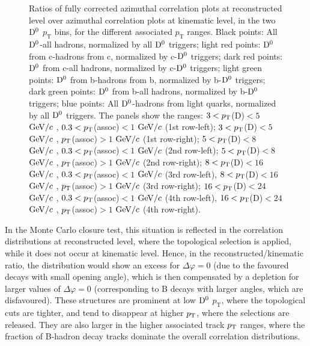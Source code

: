 \begin{figure}
\centering
\caption{Ratios of fully corrected azimuthal correlation plots at reconstructed level over azimuthal correlation plots at kinematic level, in the two ${\rm D^0}$ $p_\text{T}$ bins, for the different associated $p_\text{T}$ ranges. Black points: All ${\rm D^0}$-all hadrons, normalized by all ${\rm D^0}$ triggers; light red points: ${\rm D^0}$ from c-hadrons from c, normalized by c-${\rm D^0}$ triggers; dark red points: ${\rm D^0}$ from c-all hadrons, normalized by c-${\rm D^0}$ triggers; light green points: ${\rm D^0}$ from b-hadrons from b, normalized by b-${\rm D^0}$ triggers; dark green points: ${\rm D^0}$ from b-all hadrons, normalized by b-${\rm D^0}$ triggers; blue points: All ${\rm D^0}$-hadrons from light quarks, normalized by all ${\rm D^0}$ triggers.
The panels show the ranges: $3 < p_{\rm T}$(D)$ < 5$ $\mathrm{GeV}/c$ , $0.3 < p_{\rm T}$(assoc)$ < 1$ $\mathrm{GeV}/c$  (1st row-left); $3 < p_{\rm T}$(D)$ < 5$ $\mathrm{GeV}/c$ , $p_{\rm T}$(assoc)$ > 1$ $\mathrm{GeV}/c$  (1st row-right); $5 < p_{\rm T}$(D)$ < 8$ $\mathrm{GeV}/c$ , $0.3 < p_{\rm T}$(assoc)$ < 1$ $\mathrm{GeV}/c$  (2nd row-left); $5 < p_{\rm T}$(D)$ < 8$ $\mathrm{GeV}/c$ , $p_{\rm T}$(assoc)$ > 1$ $\mathrm{GeV}/c$  (2nd row-right);  $8 < p_{\rm T}$(D)$ < 16$ $\mathrm{GeV}/c$ , $0.3 < p_{\rm T}$(assoc)$ < 1$ $\mathrm{GeV}/c$  (3rd row-left), $8 < p_{\rm T}$(D)$ < 16$ $\mathrm{GeV}/c$ , $p_{\rm T}$(assoc)$ > 1$ $\mathrm{GeV}/c$  (3rd row-right); $16 < p_{\rm T}$(D)$ < 24$ $\mathrm{GeV}/c$ , $0.3 < p_{\rm T}$(assoc)$ < 1$ $\mathrm{GeV}/c$  (4th row-left), $16 < p_{\rm T}$(D)$ < 24$ $\mathrm{GeV}/c$ , $p_{\rm T}$(assoc)$ > 1$ $\mathrm{GeV}/c$  (4th row-right).}
\label{fig:MC_Ratios}
\end{figure}

In the Monte Carlo closure test, this situation is reflected in the correlation distributions at reconstructed level, where the topological selection is applied, while it does not occur at kinematic level. Hence, in the reconstructed/kinematic ratio, the distribution would show an excess for $\Delta\varphi = 0$ (due to the favoured decays with small opening angle), which is then compensated by a depletion for larger values of $\Delta\varphi = 0$ (corresponding to B decays with larger angles, which are disfavoured).
These structures are prominent at low ${\rm D^0}$ $p_\text{T}$, where the topological cuts are tighter, and tend to disappear at higher $p_{\rm T}$, where the selections are released. They are also larger in the higher associated track $p_{\rm T}$ ranges, where the fraction of B-hadron decay tracks dominate the overall correlation distributions.

